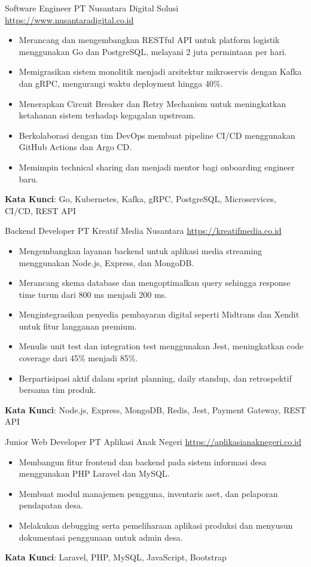 \documentclass[a4paper, serif, 10pt]{moderncv}
\begin{document}
        {Software Engineer}
        {PT Nusantara Digital Solusi}
        {\url{https://www.nusantaradigital.co.id}}
        {}
        {\begin{itemize}
\item Merancang dan mengembangkan RESTful API untuk platform logistik menggunakan Go dan PostgreSQL, melayani 2 juta permintaan per hari.
\item Memigrasikan sistem monolitik menjadi arsitektur mikroservis dengan Kafka dan gRPC, mengurangi waktu deployment hingga 40\%.
\item Menerapkan Circuit Breaker dan Retry Mechanism untuk meningkatkan ketahanan sistem terhadap kegagalan upstream.
\item Berkolaborasi dengan tim DevOps membuat pipeline CI/CD menggunakan GitHub Actions dan Argo CD.
\item Memimpin technical sharing dan menjadi mentor bagi onboarding engineer baru.
\end{itemize}
\textbf{Kata Kunci}: Go, Kubernetes, Kafka, gRPC, PostgreSQL, Microservices, CI/CD, REST API}

        {Backend Developer}
        {PT Kreatif Media Nusantara}
        {\url{https://kreatifmedia.co.id}}
        {}
        {\begin{itemize}
\item Mengembangkan layanan backend untuk aplikasi media streaming menggunakan Node.js, Express, dan MongoDB.
\item Merancang skema database dan mengoptimalkan query sehingga response time turun dari 800 ms menjadi 200 ms.
\item Mengintegrasikan penyedia pembayaran digital seperti Midtrans dan Xendit untuk fitur langganan premium.
\item Menulis unit test dan integration test menggunakan Jest, meningkatkan code coverage dari 45\% menjadi 85\%.
\item Berpartisipasi aktif dalam sprint planning, daily standup, dan retrospektif bersama tim produk.
\end{itemize}
\textbf{Kata Kunci}: Node.js, Express, MongoDB, Redis, Jest, Payment Gateway, REST API}

        {Junior Web Developer}
        {PT Aplikasi Anak Negeri}
        {\url{https://aplikasianaknegeri.co.id}}
        {}
        {\begin{itemize}
\item Membangun fitur frontend dan backend pada sistem informasi desa menggunakan PHP Laravel dan MySQL.
\item Membuat modul manajemen pengguna, inventaris aset, dan pelaporan pendapatan desa.
\item Melakukan debugging serta pemeliharaan aplikasi produksi dan menyusun dokumentasi penggunaan untuk admin desa.
\end{itemize}
\textbf{Kata Kunci}: Laravel, PHP, MySQL, JavaScript, Bootstrap}
\end{document}
